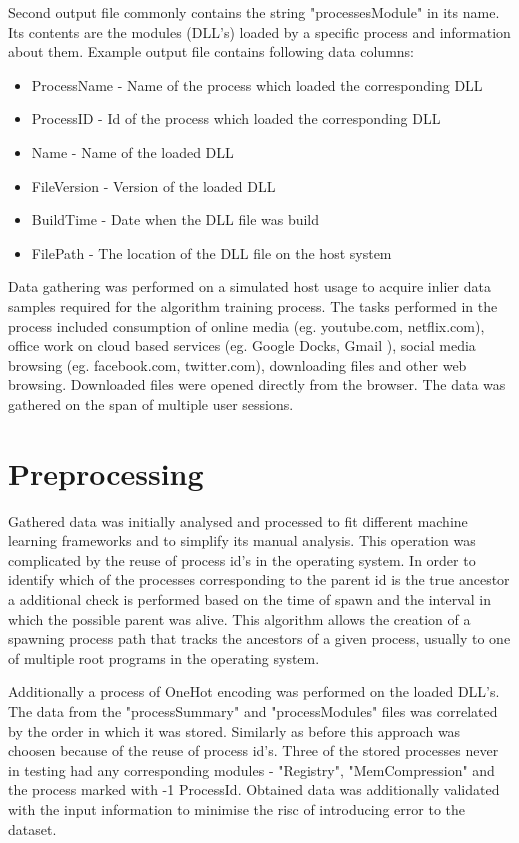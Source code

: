 \documentclass[a4paper,twoside,12pt]{book}
\begin{document}
Second output file commonly contains the string "processesModule" in its name. Its contents
are the modules (DLL's) loaded by a specific process and information about them. Example 
output file contains following data columns:
\begin{itemize}
	\item ProcessName - Name of the process which loaded the corresponding DLL
	\item ProcessID - Id of the process which loaded the corresponding DLL
	\item Name - Name of the loaded DLL
	\item FileVersion - Version of the loaded DLL
	\item BuildTime - Date when the DLL file was build
	\item FilePath - The location of the DLL file on the host system
\end{itemize}

Data gathering was performed on a simulated host usage to acquire inlier data samples required 
for the algorithm training process. The tasks performed in the process 
included consumption of online media (eg. youtube.com, netflix.com), office work on cloud 
based services (eg. Google Docks, Gmail ), social media browsing (eg. facebook.com, 
twitter.com), downloading files and other web browsing. Downloaded files were opened 
directly from the browser. The data was gathered on the span of multiple user sessions.

\section{Preprocessing}

Gathered data was initially analysed and processed to fit different machine learning 
frameworks and to simplify its manual analysis. This operation was complicated by the 
reuse of process id's in the operating system. In order to identify which of the processes 
corresponding to the parent id is the true ancestor a additional check is performed based 
on the time of spawn and the interval in which the possible parent was alive. This algorithm 
allows the creation of a spawning process path that tracks the ancestors of a given process, 
usually to one of multiple root programs in the operating system. 

Additionally a process of OneHot encoding was performed on the loaded DLL's. The data from 
the "processSummary" and "processModules" files was correlated by the order in which it was 
stored. Similarly as before this approach was choosen because of the reuse of process id's.
Three of the stored processes never in testing had any corresponding modules - 
"Registry", "MemCompression" and the process marked with -1 ProcessId. Obtained data was
additionally validated with the input information to minimise the risc of introducing error
to the dataset.
\end{document}
